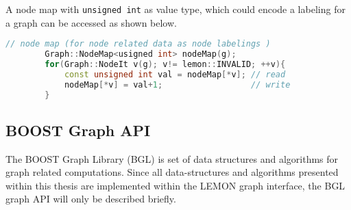        A node map with  \lstinline{unsigned int} as value type,
        which could encode a labeling for a graph 
        can be accessed as shown below.

        \begin{lstlisting}[language=c++]
        // node map (for node related data as node labelings )
        Graph::NodeMap<usigned int> nodeMap(g);
        for(Graph::NodeIt v(g); v!= lemon::INVALID; ++v){
            const unsigned int val = nodeMap[*v]; // read
            nodeMap[*v] = val+1;                  // write
        }
        \end{lstlisting}




\subsection{BOOST Graph API}\label{sec:boost_graph_apis}
The BOOST Graph Library (BGL)  \citep{boost_bgl} is set of data structures and 
algorithms for graph related computations.
Since all  data-structures and algorithms presented within this thesis  are implemented within the LEMON graph interface, 
the BGL graph API will only be described briefly.


